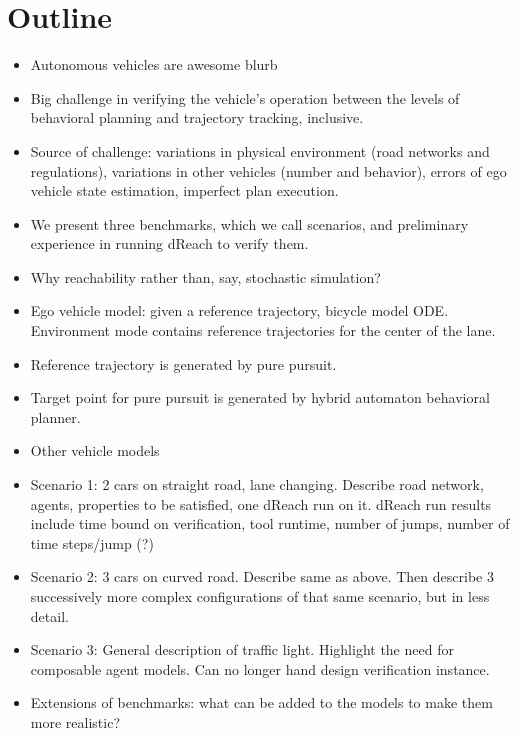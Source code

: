 \section{Outline}
\begin{itemize}
\item Autonomous vehicles are awesome blurb 

\item Big challenge in verifying the vehicle's operation between the levels of behavioral planning and trajectory tracking, inclusive. 
\item Source of challenge: variations in physical environment (road networks and regulations), variations in other vehicles (number and behavior), errors of ego vehicle state estimation, imperfect plan execution.
\item We present three benchmarks, which we call scenarios, and preliminary experience in running dReach to verify them.
\item Why reachability rather than, say, stochastic simulation?
\item Ego vehicle model: given a reference trajectory, bicycle model ODE. Environment mode contains reference trajectories for the center of the lane. 
\item Reference trajectory is generated by pure pursuit. 
\item Target point for pure pursuit is generated by hybrid automaton behavioral planner.
\item Other vehicle models
\item Scenario 1: 2 cars on straight road, lane changing.
Describe road network, agents, properties to be satisfied, one dReach run on it.
dReach run results include time bound on verification, tool runtime, number of jumps, number of time steps/jump (?)
\item Scenario 2: 3 cars on curved road. 
Describe same as above.
Then describe 3 successively more complex configurations of that same scenario, but in less detail.
\item Scenario 3: General description of traffic light. Highlight the need for composable agent models. Can no longer hand design verification instance. 
\item Extensions of benchmarks: what can be added to the models to make them more realistic?
\end{itemize}


